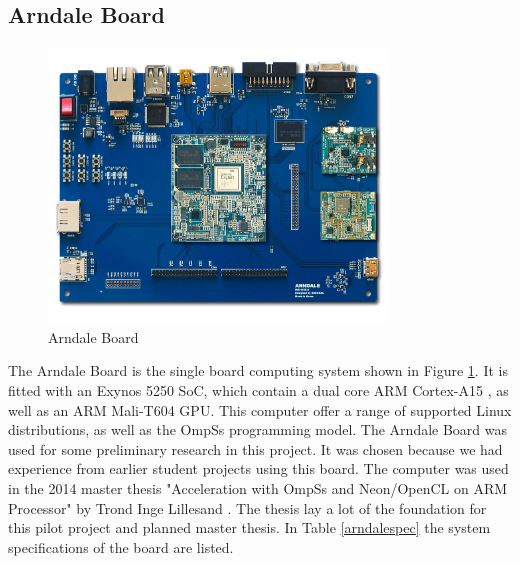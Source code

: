 \subsection{Arndale Board} \label{ArndaleBoard}
\begin{figure}[ht!]
  \centering
  \includegraphics[width=90mm]{fig/Arendale.jpg}
  \caption{Arndale Board \label{ArndaleBoardImage}}
\end{figure}
The Arndale Board is the single board computing system shown in Figure \ref{ArndaleBoardImage}.
It is fitted with an Exynos 5250 SoC, which contain a dual core ARM Cortex-A15 , as well as an ARM Mali-T604 GPU.
This computer offer a range of supported Linux distributions, as well as the OmpSs programming model.
The Arndale Board was used for some preliminary research in this project.
It was chosen because we had experience from earlier student projects using this board.
The computer was used in the 2014 master thesis "Acceleration with OmpSs and Neon/OpenCL on ARM Processor" by Trond Inge Lillesand \cite{lillesand13}.
The thesis lay a lot of the foundation for this pilot project and planned master thesis.
In Table \ref{arndalespec} the system specifications of the board are listed.

